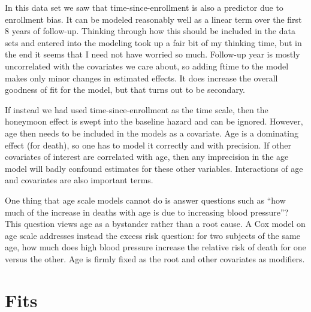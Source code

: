 \documentclass[11pt]{article}
\begin{document}
In this data set we saw that time-since-enrollment is also a predictor due to
enrollment bias.
It can be modeled reasonably well as a linear term over the first 8 years
of follow-up.  
Thinking through how this should be included in the data sets and entered into
the modeling took up a fair bit of my thinking time, but in the end it seems
that I need not have worried so much. Follow-up year is mostly uncorrelated
with the covariates we care about, so adding ftime to the model makes 
only minor
changes in estimated effects.  
It does increase the overall goodness of fit for the model,
but that turns out to be secondary.

If instead we had used time-since-enrollment as the time scale, then 
the honeymoon effect is swept into the baseline hazard and can be ignored.
However, age then needs to be included in the models as a covariate.
Age is a dominating effect (for death), so one has to
model it correctly and with precision.  If other covariates of interest are
correlated with age, then any imprecision in the age model will badly confound 
estimates for these other variables.  Interactions of age and covariates
are also important terms.

One thing that age scale models cannot do is answer questions such as
``how much of the increase in deaths with age is due to increasing blood
pressure''?  This question views age as a bystander rather than a root cause.
A Cox model on age scale addresses instead the excess risk question: for
two subjects of the same age, how much does high blood pressure increase
the relative risk of death for one versus the other.  Age is firmly fixed as
the root and other covariates as modifiers.

\section{Fits}
\end{document}
